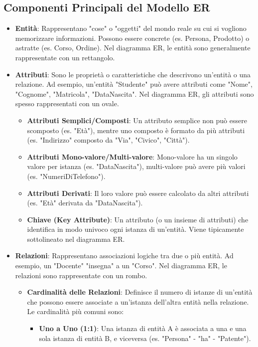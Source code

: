 \subsection{Componenti Principali del Modello ER}
\begin{itemize}
    \item \textbf{Entità}: Rappresentano "cose" o "oggetti" del mondo reale su cui si vogliono memorizzare informazioni. Possono essere concrete (es. Persona, Prodotto) o astratte (es. Corso, Ordine). Nel diagramma ER, le entità sono generalmente rappresentate con un rettangolo.
    \item \textbf{Attributi}: Sono le proprietà o caratteristiche che descrivono un'entità o una relazione. Ad esempio, un'entità "Studente" può avere attributi come "Nome", "Cognome", "Matricola", "DataNascita". Nel diagramma ER, gli attributi sono spesso rappresentati con un ovale.
    \begin{itemize}
        \item \textbf{Attributi Semplici/Composti}: Un attributo semplice non può essere scomposto (es. "Età"), mentre uno composto è formato da più attributi (es. "Indirizzo" composto da "Via", "Civico", "Città").
        \item \textbf{Attributi Mono-valore/Multi-valore}: Mono-valore ha un singolo valore per istanza (es. "DataNascita"), multi-valore può avere più valori (es. "NumeriDiTelefono").
        \item \textbf{Attributi Derivati}: Il loro valore può essere calcolato da altri attributi (es. "Età" derivata da "DataNascita").
        \item \textbf{Chiave (Key Attribute)}: Un attributo (o un insieme di attributi) che identifica in modo univoco ogni istanza di un'entità. Viene tipicamente sottolineato nel diagramma ER.
    \end{itemize}
    \item \textbf{Relazioni}: Rappresentano associazioni logiche tra due o più entità. Ad esempio, un "Docente" "insegna" a un "Corso". Nel diagramma ER, le relazioni sono rappresentate con un rombo.
    \begin{itemize}
        \item \textbf{Cardinalità delle Relazioni}: Definisce il numero di istanze di un'entità che possono essere associate a un'istanza dell'altra entità nella relazione. Le cardinalità più comuni sono:
        \begin{itemize}
            \item \textbf{Uno a Uno (1:1)}: Una istanza di entità A è associata a una e una sola istanza di entità B, e viceversa (es. "Persona" - "ha" - "Patente").

\end{itemize}
\end{itemize}
\end{itemize}
